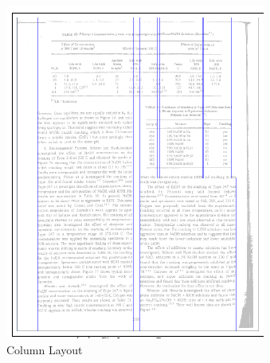\begin{figure}[H]
\hspace*{\fill} %
\begin{subfigure}{0.31\textwidth}
\includegraphics[width=\linewidth]{img/tableDetection/tableDetectionColumns.pdf}
\caption{Column Layout} \label{fig:1a}
\end{subfigure}
\hspace*{\fill} %
\begin{subfigure}{0.31\textwidth}

\end{subfigure}
\end{figure}
